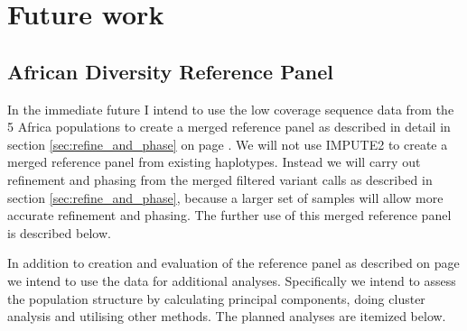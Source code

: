 \chapter{Future work}
\label{ch:future}

\section{African Diversity Reference Panel}
In the immediate future I intend to use the low coverage sequence data from the 5 Africa populations to create a merged reference panel as described in detail in section \ref{sec:refine_and_phase} on page \pageref{sec:refine_and_phase}. We will not use IMPUTE2 to create a merged reference panel from existing haplotypes. Instead we will carry out refinement and phasing from the merged filtered variant calls as described in section \ref{sec:refine_and_phase}, because a larger set of samples will allow more accurate refinement and phasing. The further use of this merged reference panel is described below.

In addition to creation and evaluation of the reference panel as described on page we intend to use the data for additional analyses. Specifically we intend to assess the population structure by calculating principal components, doing cluster analysis and utilising other methods. The planned analyses are itemized below.

